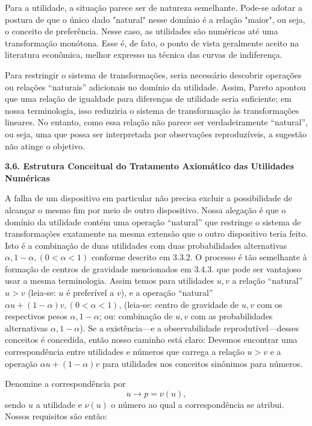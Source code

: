 \documentclass[12pt]{article}
\begin{document}
Para a utilidade, a situação parece ser de natureza semelhante. Pode-se adotar a postura de que o único dado "natural" nesse domínio é a relação "maior", ou seja, o conceito de preferência. Nesse caso, as utilidades são numéricas até uma transformação monótona. Esse é, de fato, o ponto de vista geralmente aceito na literatura econômica, melhor expresso na técnica das curvas de indiferença.

Para restringir o sistema de transformações, seria necessário descobrir operações ou relações “naturais” adicionais no domínio da utilidade. Assim, Pareto apontou que uma relação de igualdade para diferenças de utilidade seria suficiente; em nossa terminologia, isso reduziria o sistema de transformação às transformações lineares. No entanto, como essa relação não parece ser verdadeiramente “natural”, ou seja, uma que possa ser interpretada por observações reproduzíveis, a sugestão não atinge o objetivo.

\textbf{3.6. Estrutura Conceitual do Tratamento Axiomático das Utilidades Numéricas}

A falha de um dispositivo em particular não precisa excluir a possibilidade de alcançar o mesmo fim por meio de outro dispositivo. Nossa alegação é que o domínio da utilidade contém uma operação ``natural'' que restringe o sistema de transformações exatamente na mesma extensão que o outro dispositivo teria feito. Isto é a combinação de duas utilidades com duas probabilidades alternativas $\alpha, 1 - \alpha, (0 < \alpha < 1)$ conforme descrito em 3.3.2. O processo é tão semelhante à formação de centros de gravidade mencionados em 3.4.3. que pode ser vantajoso usar a mesma terminologia. Assim temos para utilidades $u, v$ a relação ``natural'' $u > v$ (leia-se: $u$ é preferível a $v$), e a operação ``natural'' $\alpha u + (1 - \alpha)v, (0 < \alpha < 1)$, (leia-se: centro de gravidade de $u, v$ com os respectivos pesos $\alpha, 1 - \alpha$; ou: combinação de $u, v$ com as probabilidades alternativas $\alpha, 1 - \alpha$). Se a existência---e a observabilidade reprodutível---desses conceitos é concedida, então nosso caminho está claro: Devemos encontrar uma correspondência entre utilidades e números que carrega a relação $u > v$ e a operação $\alpha u + (1 - \alpha)v$ para utilidades nos conceitos sinônimos para números.

Denomine a correspondência por
\[ u \rightarrow p = \nu(u), \]
sendo $u$ a utilidade e $\nu(u)$ o número ao qual a correspondência se atribui. Nossos requisitos são então:
\end{document}
